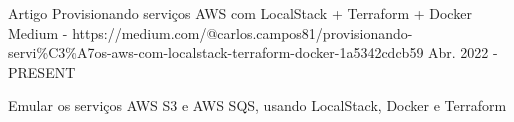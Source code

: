 

\begin{cventries}

  \cventry
    {Artigo} %
    {Provisionando serviços AWS com LocalStack + Terraform + Docker} %
    {Medium - https://medium.com/@carlos.campos81/provisionando-servi\%C3\%A7os-aws-com-localstack-terraform-docker-1a5342cdcb59 } %
    {Abr. 2022 - PRESENT} %
    {
      \begin{cvitems} %
        \item {Emular os serviços AWS S3 e AWS SQS, usando LocalStack, Docker e Terraform}
      \end{cvitems}
    }


\end{cventries}
